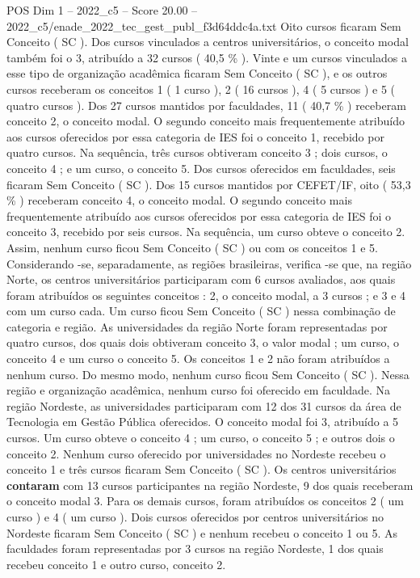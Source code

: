 \begin{textsample}{POS Dim 1 – 2022\_c5 – Score 20.00 – 2022\_c5/enade\_2022\_tec\_gest\_publ\_f3d64ddc4a.txt}
Oito cursos ficaram Sem Conceito ( SC ).
Dos cursos vinculados a centros universitários, o conceito modal também foi o 3, atribuído a 32 cursos ( 40,5 \% ).
Vinte e um cursos vinculados a esse tipo de organização acadêmica ficaram Sem Conceito ( SC ), e os outros cursos receberam os conceitos 1 ( 1 curso ), 2 ( 16 cursos ), 4 ( 5 cursos ) e 5 ( quatro cursos ).
Dos 27 cursos mantidos por faculdades, 11 ( 40,7 \% ) receberam conceito 2, o conceito modal.
O segundo conceito mais frequentemente atribuído aos cursos oferecidos por essa categoria de IES foi o conceito 1, recebido por quatro cursos.
Na sequência, três cursos obtiveram conceito 3 ; dois cursos, o conceito 4 ; e um curso, o conceito 5.
Dos cursos oferecidos em faculdades, seis ficaram Sem Conceito ( SC ).
Dos 15 cursos mantidos por CEFET/IF, oito ( 53,3 \% ) receberam conceito 4, o conceito modal.
O segundo conceito mais frequentemente atribuído aos cursos oferecidos por essa categoria de IES foi o conceito 3, recebido por seis cursos.
Na sequência, um curso obteve o conceito 2.
Assim, nenhum curso ficou Sem Conceito ( SC ) ou com os conceitos 1 e 5.
Considerando -se, separadamente, as regiões brasileiras, verifica -se que, na região Norte, os centros universitários participaram com 6 cursos avaliados, aos quais foram atribuídos os seguintes conceitos : 2, o conceito modal, a 3 cursos ; e 3 e 4 com um curso cada.
Um curso ficou Sem Conceito ( SC ) nessa combinação de categoria e região.
As universidades da região Norte foram representadas por quatro cursos, dos quais dois obtiveram conceito 3, o valor modal ; um curso, o conceito 4 e um curso o conceito 5.
Os conceitos 1 e 2 não foram atribuídos a nenhum curso.
Do mesmo modo, nenhum curso ficou Sem Conceito ( SC ).
Nessa região e organização acadêmica, nenhum curso foi oferecido em faculdade.
Na região Nordeste, as universidades participaram com 12 dos 31 cursos da área de Tecnologia em Gestão Pública oferecidos.
O conceito modal foi 3, atribuído a 5 cursos.
Um curso obteve o conceito 4 ; um curso, o conceito 5 ; e outros dois o conceito 2.
Nenhum curso oferecido por universidades no Nordeste recebeu o conceito 1 e três cursos ficaram Sem Conceito ( SC ).
Os centros universitários \textbf{contaram} com 13 cursos participantes na região Nordeste, 9 dos quais receberam o conceito modal 3.
Para os demais cursos, foram atribuídos os conceitos 2 ( um curso ) e 4 ( um curso ).
Dois cursos oferecidos por centros universitários no Nordeste ficaram Sem Conceito ( SC ) e nenhum recebeu o conceito 1 ou 5.
As faculdades foram representadas por 3 cursos na região Nordeste, 1 dos quais recebeu conceito 1 e outro curso, conceito 2.

\end{textsample}
